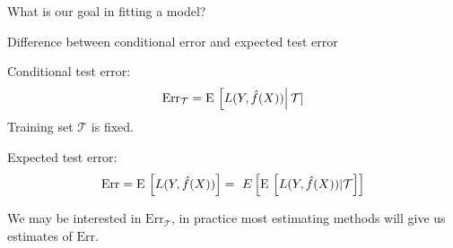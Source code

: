 \documentclass[xcolor={table}, handout]{beamer}
\begin{document}

\begin{frame}{What is our goal in fitting a model?}

\begin{wideitemize}
\item Difference between conditional error and expected test error\pause
\begin{wideitemize}
\item Conditional test error:
\[
\textrm{Err}_{\mathcal{T}} = {\textrm E}\, \left[ L(Y, \hat{f}(X))\right \rvert \mathcal{T}]
\]
Training set $\mathcal{T}$ is fixed. \pause

\item Expected test error:
\[
\textrm{Err} = {\textrm E}\, \left[ L(Y, \hat{f}(X))\right] =\ E \left[  {\textrm E}\, \left[ L(Y, \hat{f}(X)) \rvert \mathcal{T}\right] \right]
\]
\end{wideitemize}\pause
\item We may be interested in $\textrm{Err}_{\mathcal{T}}$, in practice most estimating methods will give us estimates of $\textrm{Err}$. 
\end{wideitemize}

\end{frame}


\end{document}
